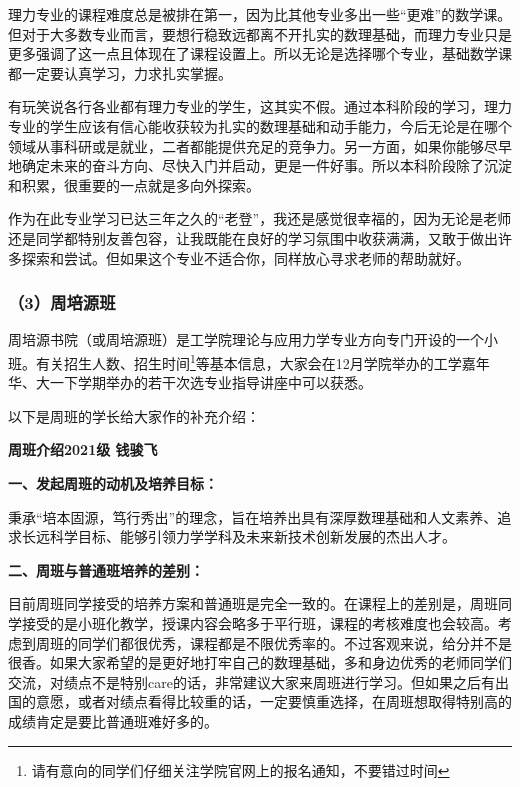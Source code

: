 \documentclass[11pt,oneside]{book}
\begin{document}
\vspace{10pt}

理力专业的课程难度总是被排在第一，因为比其他专业多出一些“更难”的数学课。但对于大多数专业而言，要想行稳致远都离不开扎实的数理基础，而理力专业只是更多强调了这一点且体现在了课程设置上。所以无论是选择哪个专业，基础数学课都一定要认真学习，力求扎实掌握。

\vspace{10pt}

有玩笑说各行各业都有理力专业的学生，这其实不假。通过本科阶段的学习，理力专业的学生应该有信心能收获较为扎实的数理基础和动手能力，今后无论是在哪个领域从事科研或是就业，二者都能提供充足的竞争力。另一方面，如果你能够尽早地确定未来的奋斗方向、尽快入门并启动，更是一件好事。所以本科阶段除了沉淀和积累，很重要的一点就是多向外探索。

\vspace{10pt}

作为在此专业学习已达三年之久的“老登”，我还是感觉很幸福的，因为无论是老师还是同学都特别友善包容，让我既能在良好的学习氛围中收获满满，又敢于做出许多探索和尝试。但如果这个专业不适合你，同样放心寻求老师的帮助就好。

\subsubsection{（3）周培源班}

周培源书院（或周培源班）是工学院理论与应用力学专业方向专门开设的一个小班。有关招生人数、招生时间\footnote{请有意向的同学们仔细关注学院官网上的报名通知，不要错过时间}等基本信息，大家会在12月学院举办的工学嘉年华、大一下学期举办的若干次选专业指导讲座中可以获悉。

\vspace{10pt}

以下是周班的学长给大家作的补充介绍：

\textbf{周班介绍\quad 2021级 钱骏飞}

\vspace{10pt}

\textbf{\textbf{一、发起周班的动机及培养目标：}}

秉承“培本固源，笃行秀出”的理念，旨在培养出具有深厚数理基础和人文素养、追求长远科学目标、能够引领力学学科及未来新技术创新发展的杰出人才。

\vspace{10pt}

\textbf{\textbf{二、周班与普通班培养的差别：}}

目前周班同学接受的培养方案和普通班是完全一致的。在课程上的差别是，周班同学接受的是小班化教学，授课内容会略多于平行班，课程的考核难度也会较高。考虑到周班的同学们都很优秀，课程都是不限优秀率的。不过客观来说，给分并不是很香。如果大家希望的是更好地打牢自己的数理基础，多和身边优秀的老师同学们交流，对绩点不是特别care的话，非常建议大家来周班进行学习。但如果之后有出国的意愿，或者对绩点看得比较重的话，一定要慎重选择，在周班想取得特别高的成绩肯定是要比普通班难好多的。
\end{document}
